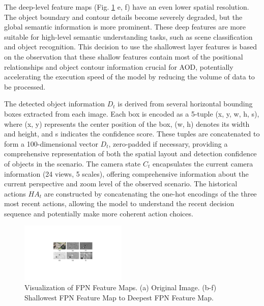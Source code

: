 \documentclass[lettersize,journal]{IEEEtran}
\begin{document}
The deep-level feature maps (Fig. \ref{FPN_features} e, f) have an even lower spatial resolution. The object boundary and contour details become severely degraded, but the global semantic information is more prominent. These deep features are more suitable for high-level semantic understanding tasks, such as scene classification and object recognition.
This decision to use the shallowest layer features is based on the observation that these shallow features contain most of the positional relationships and object contour information crucial for AOD, potentially accelerating the execution speed of the model by reducing the volume of data to be processed.

The detected object information $D_t$ is derived from several horizontal bounding boxes extracted from each image. Each box is encoded as a 5-tuple (x, y, w, h, s), where (x, y) represents the center position of the box, (w, h) denotes its width and height, and s indicates the confidence score. These tuples are concatenated to form a 100-dimensional vector $D_t$, zero-padded if necessary, providing a comprehensive representation of both the spatial layout and detection confidence of objects in the scenario. The camera state $C_t$ encapsulates the current camera information (24 views, 5 scales), offering comprehensive information about the current perspective and zoom level of the observed scenario. The historical actions ${HA}_t$ are constructed by concatenating the one-hot encodings of the three most recent actions, allowing the model to understand the recent decision sequence and potentially make more coherent action choices.

\begin{figure}[!t]
    \centering
    \includegraphics[width=0.45\textwidth]{fig/shallow_feature.pdf}
    \caption{Visualization of FPN Feature Maps. (a) Original Image. (b-f) Shallowest FPN Feature Map to Deepest FPN Feature Map.}
    \label{FPN_features}
\end{figure}
\end{document}
